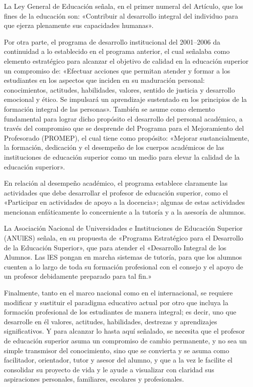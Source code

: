 La Ley General de Educación señala, en el primer numeral del Artículo,  que los fines de la educación son: «Contribuir al desarrollo integral del individuo para que ejerza plenamente sus capacidades humanas».

Por otra parte,  el programa de desarrollo institucional del 2001--2006 da continuidad a lo establecido en el programa anterior, el cual señalaba como elemento estratégico para alcanzar el  objetivo  de  calidad en  la educación superior un  compromiso  de: «Efectuar acciones  que  permitan  atender  y  formar  a  los  estudiantes en los aspectos que inciden en su maduración personal: conocimientos, actitudes, habilidades, valores,  sentido  de  justicia  y  desarrollo  emocional  y  ético.  Se impulsará un aprendizaje sustentado en los principios de la formación integral de las personas». También se asume como elemento fundamental para lograr dicho propósito el desarrollo del personal académico, a través del compromiso que se desprende del Programa para el Mejoramiento del Profesorado (PROMEP), el cual tiene como propósito: «Mejorar sustancialmente, la formación, dedicación y el desempeño de los cuerpos académicos de las instituciones de educación superior como un medio para elevar la calidad de la educación superior».

En relación al desempeño académico, el programa establece claramente las actividades que debe desarrollar el profesor de educación superior, como el «Participar en actividades de apoyo a la docencia»; algunas de estas actividades mencionan  enfáticamente lo concerniente a la tutoría y a la asesoría de alumnos.

La Asociación Nacional de Universidades e Instituciones de Educación Superior (ANUlES) señala, en su propuesta de «Programa Estratégico para el Desarrollo de la Educación Superior», que para atender el «Desarrollo Integral de los Alumnos. Las lES pongan en marcha sistemas de tutoría, para que los alumnos cuenten a lo largo de toda su formación profesional con el consejo y el apoyo de un profesor debidamente preparado para tal fin.»

\enlargethispage{1\baselineskip}
Finalmente,  tanto  en el marco  nacional  como en el internacional,  se requiere  modificar y sustituir el paradigma educativo actual por otro  que  incluya  la   formación profesional de los estudiantes de manera integral; es decir, uno que  desarrolle en  él valores, actitudes, habilidades, destrezas y aprendizajes significativos. Y para alcanzar lo hasta aquí señalado, se necesita  que  el profesor  de educación  superior  asuma  un compromiso de cambio permanente,  y no sea   un  simple transmisor  del  conocimiento, sino que se convierta y se asuma como facilitador, orientador, tutor y asesor del alumno, y que a la vez le facilite el consolidar su proyecto de vida y le ayude a visualizar con claridad sus aspiraciones personales,  familiares, escolares  y profesionales.


